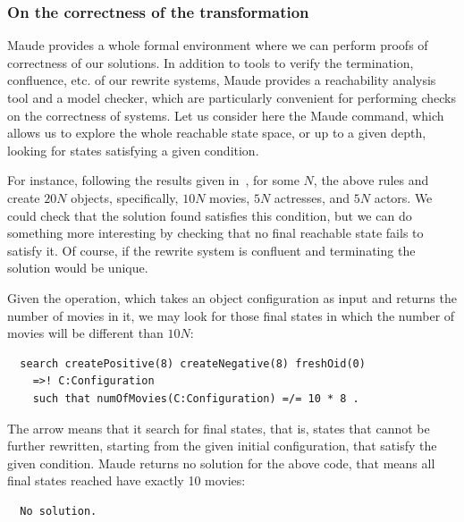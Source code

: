 \subsubsection{On the correctness of the transformation}

Maude provides a whole formal environment where we can perform proofs of correctness of our solutions. In addition to tools to verify the termination, confluence, etc. of our rewrite systems, Maude provides a reachability analysis tool and a model checker, which are particularly convenient for performing checks on the correctness of systems. Let us consider here the Maude  command, which allows us to explore the whole reachable state space, or up to a given depth, looking for states satisfying a given condition. 

For instance, following the results given in~\cite{imdbcase}, for some $N$, the above rules  and  create $20N$ objects, specifically, $10N$ movies, $5N$ actresses, and $5N$ actors. We could check that the solution found satisfies this condition, but we can do something more interesting by checking that no final reachable state fails to satisfy it. Of course, if the rewrite system is confluent and terminating the solution would be unique. 

Given the  operation, which takes an object configuration as input and returns the number of movies in it, we may look for those final states in which the number of movies will be different than $10N$:
\begin{verbatim}
  search createPositive(8) createNegative(8) freshOid(0) 
    =>! C:Configuration
    such that numOfMovies(C:Configuration) =/= 10 * 8 .
\end{verbatim}

The arrow \code{=>!} means that it search for final states, that is, states that cannot be further rewritten, starting from the given initial configuration, that satisfy the given condition. Maude returns no solution for the above code, that means all final states reached have exactly 10 movies:
\begin{verbatim}
  No solution.
\end{verbatim}


